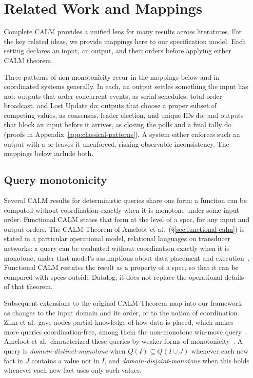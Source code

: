 \section{Related Work and Mappings}
\label{sec:instances}
\label{sec:related}

Complete CALM provides a unified lens for many results across literatures.
For the key related ideas, we provide mappings here to our specification model.
Each setting declares an input, an output, and their orders before
applying either CALM theorem.

Three patterns of non-monotonicity recur in the mappings below and in
coordinated systems generally.  In each, an output settles something the input
has not: outputs that order concurrent events, as serial schedules,
total-order broadcast, and Lost Update do; outputs that choose a proper subset
of competing values, as consensus, leader election, and unique IDs do; and
outputs that block an input before it arrives, as closing the polls and a
final tally do (proofs in Appendix~\ref{app:classical-patterns}).  A system either enforces such
an output with a \commitment or leaves it unenforced, risking observable
inconsistency.  The mappings below include both.

\subsection{Query monotonicity}
\label{sec:query-instance}

Several CALM results for deterministic queries share one form: a function can
be computed without coordination exactly when it is monotone under some input
order.  Functional CALM states that form at the level of a spec, for any input
and output orders.  The CALM Theorem of Ameloot et al.\ (\S\ref{sec:functional-calm}) is stated in
a particular operational model, relational languages on transducer networks: a query can be evaluated without
coordination exactly when it is monotone, under that model's assumptions about
data placement and execution~\cite{ameloot2013relational,ameloot2015weaker}.
Functional CALM restates the result as a property of a spec, so that it can be
compared with specs outside Datalog; it does not replace the operational details
of that theorem.

Subsequent extensions to the original CALM Theorem map into our framework as
changes to the input domain and its order, or to the notion of coordination.
Zinn et al.\ gave nodes partial knowledge of how data is placed, which makes
more queries coordination-free, among them the non-monotone win-move
query~\cite{zinn2012winmove}.  Ameloot et al.\ characterized these queries by
weaker forms of monotonicity~\cite{ameloot2015weaker}.  A query is
\emph{domain-distinct-monotone} when $Q(I)\subseteq Q(I\cup J)$ whenever each
new fact in $J$ contains a value not in $I$, and
\emph{domain-disjoint-monotone} when this holds whenever each new fact uses
only such values.

